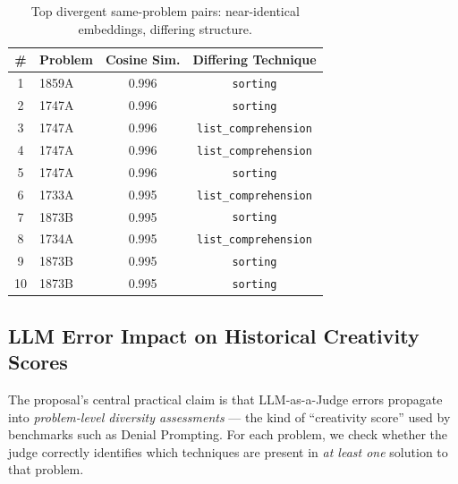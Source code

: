 \documentclass{article}
\begin{document}
\begin{table}[htbp]
\centering
\begin{tabular}{clcc}
\toprule
\textbf{\#} & \textbf{Problem} & \textbf{Cosine Sim.} & \textbf{Differing Technique} \\
\midrule
1  & 1859A & 0.996 & \texttt{sorting} \\
2  & 1747A & 0.996 & \texttt{sorting} \\
3  & 1747A & 0.996 & \texttt{list\_comprehension} \\
4  & 1747A & 0.996 & \texttt{list\_comprehension} \\
5  & 1747A & 0.996 & \texttt{sorting} \\
6  & 1733A & 0.995 & \texttt{list\_comprehension} \\
7  & 1873B & 0.995 & \texttt{sorting} \\
8  & 1734A & 0.995 & \texttt{list\_comprehension} \\
9  & 1873B & 0.995 & \texttt{sorting} \\
10 & 1873B & 0.995 & \texttt{sorting} \\
\bottomrule
\end{tabular}
\caption{Top divergent same-problem pairs: near-identical embeddings, differing structure.}
\label{tab:divergent}
\end{table}

\subsection{LLM Error Impact on Historical Creativity Scores}

The proposal's central practical claim is that LLM-as-a-Judge errors propagate
into \emph{problem-level diversity assessments} --- the kind of ``creativity
score'' used by benchmarks such as Denial Prompting. For each problem, we
check whether the judge correctly identifies which techniques are present in
\emph{at least one} solution to that problem.
\end{document}
